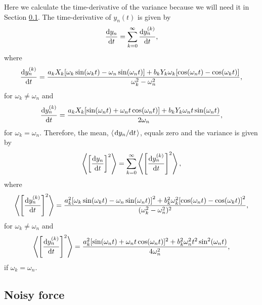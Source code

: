 Here we calculate the time-derivative of the variance because we will need it in Section \ref{sec:noisy_force}. The time-derivative of $y_n(t)$ is given by
\begin{equation}
    \dv{y_n}{t} = \sum_{k=0}^\infty\dv{y_n^{(k)}}{t},
\end{equation}
where
\begin{equation}
    \dv{y_n^{(k)}}{t} = \frac{a_k X_k\qty[\omega_k\sin(\omega_k t) - \omega_n\sin(\omega_n t) ] + b_k Y_k \omega_k\qty[\cos(\omega_n t) - \cos(\omega_k t)]}{\omega_k^2 - \omega_n^2},
\end{equation}
for $\omega_k\ne \omega_n$ and
\begin{equation}
    \label{eq:variance_d_velocity_dt}
    \dv{y_n^{(k)}}{t} = \frac{a_k X_k [\sin(\omega_n t) + \omega_n t \cos(\omega_n t)]+ b_k Y_k \omega_n t \sin(\omega_n t)}{2\omega_n},
\end{equation}
for $\omega_k = \omega_n$. Therefore, the mean, $\langle \dv*{y_n}{t} \rangle$, equals zero and the variance is given by
\begin{equation}
    \left\langle \qty[\dv{y_n}{t}]^2 \right\rangle = \sum_{k=0}^\infty \left\langle \qty[\dv{y_n^{(k)}}{t}]^2 \right\rangle,
\end{equation}
where
\begin{equation}
    \left\langle \qty[\dv{y_n^{(k)}}{t}]^2 \right\rangle = \frac{a_k^2\qty[\omega_k\sin(\omega_k t) - \omega_n\sin(\omega_n t)]^2 + b_k^2\omega_k^2 \qty[\cos(\omega_n t) - \cos(\omega_k t)]^2}{(\omega_k^2 - \omega_n^2)^2},
\end{equation}
for $\omega_k\ne\omega_n$ and
\begin{equation}
   \left\langle \qty[\dv{y_n^{(k)}}{t}]^2 \right\rangle = \frac{a_k^2 [\sin(\omega_n t) + \omega_n t \cos(\omega_n t)]^2+ b_k^2  \omega_n^2 t^2 \sin^2(\omega_n t)}{4\omega_n^2},
\end{equation}
if $\omega_k=\omega_n$.

\subsection{Noisy force}
\label{sec:noisy_force}

